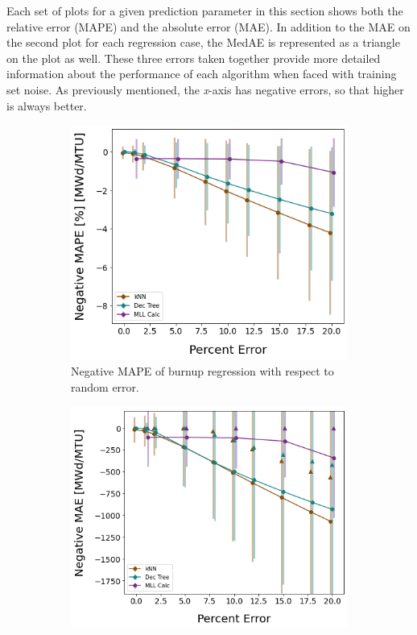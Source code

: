Each set of plots for a given prediction parameter in this section shows both
the relative error (\gls{MAPE}) and the absolute error (\gls{MAE}). In addition
to the \gls{MAE} on the second plot for each regression case, the \gls{MedAE}
is represented as a triangle on the plot as well. These three errors taken
together provide more detailed information about the performance of each
algorithm when faced with training set noise.  As previously mentioned, the
\textit{x}-axis has negative errors, so that higher is always better.  

\begin{figure}[!htb]
  \centering
  \begin{subfigure}[b]{0.48\textwidth}
    \centering
    \includegraphics[width=\textwidth]{./chapters/exp1/randerr_compare_nuc29_MAPE_burn.png}
    \caption{Negative \gls{MAPE} of burnup regression with respect to 
             random error.}
    \label{fig:burnmape}
  \end{subfigure}
  \hfill
  \begin{subfigure}[b]{0.5\textwidth}
    \centering
    \includegraphics[width=\textwidth]{./chapters/exp1/randerr_compare_nuc29_MAE_burn.png}

\end{subfigure}
\end{figure}
